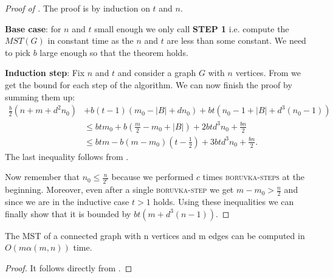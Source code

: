 \begin{proof}[Proof of ]

The proof is by induction on $t$ and $n$.

\textbf{Base case}:
for $n$ and $t$ small enough we only call \textbf{STEP 1} i.e. compute the $MST(G)$ in constant time as the $n$ and $t$ are less than some constant. We need to pick $b$ large enough so that the theorem holds.

\textbf{Induction step}:
Fix $n$ and $t$ and consider a graph $G$ with $n$ vertices. From  we get the bound for each step of the algorithm. We can now finish the proof by summing them up:
\begin{align*}
\frac{b}2\left(n+m+d^2n_0\right) & + b(t-1)\left(m_0 - |B| + dn_0\right) + bt\left(n_0 - 1 + |B| + d^3(n_0 - 1)\right) \\
 & \leq btm_0 + b\left(\frac{m}2 - m_0 + |B|\right) + 2btd^3n_0 + \frac{bn}2 \\
 & \leq btm - b(m - m_0)\left(t - \frac12\right) + 3btd^3n_0 + \frac{bn}{2}.
\end{align*}
The last inequality follows from .

Now remember that $n_0 \leq \frac{n}{2^c}$ because we performed $c$ times \textsc{boruvka-steps} at the beginning. Moreover, even after a single \textsc{boruvka-step} we get $m - m_0 > \frac{n}{2}$ and since we are in the inductive case $t > 1$ holds. Using these inequalities we can finally show that it is bounded by $bt\left(m+ d^3(n-1)\right)$.
\end{proof}

\begin{theorem}
    The MST of a connected graph with n vertices and m edges can be computed in $O(m\alpha(m, n))$ time.
\end{theorem}
\begin{proof}
    It follows directly from .
\end{proof}
